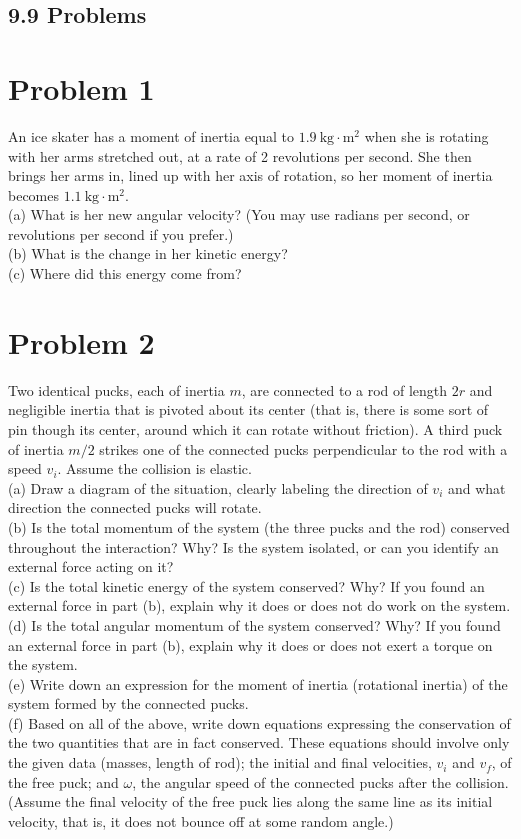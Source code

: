 \documentclass[10pt]{article}
\begin{document}
\subsection*{9.9 Problems}
\section*{Problem 1}
An ice skater has a moment of inertia equal to $1.9 \mathrm{~kg} \cdot \mathrm{m}^{2}$ when she is rotating with her arms stretched out, at a rate of 2 revolutions per second. She then brings her arms in, lined up with her axis of rotation, so her moment of inertia becomes $1.1 \mathrm{~kg} \cdot \mathrm{m}^{2}$.\\
(a) What is her new angular velocity? (You may use radians per second, or revolutions per second if you prefer.)\\
(b) What is the change in her kinetic energy?\\
(c) Where did this energy come from?

\section*{Problem 2}
Two identical pucks, each of inertia $m$, are connected to a rod of length $2 r$ and negligible inertia that is pivoted about its center (that is, there is some sort of pin though its center, around which it can rotate without friction). A third puck of inertia $m / 2$ strikes one of the connected pucks perpendicular to the rod with a speed $v_{i}$. Assume the collision is elastic.\\
(a) Draw a diagram of the situation, clearly labeling the direction of $v_{i}$ and what direction the connected pucks will rotate.\\
(b) Is the total momentum of the system (the three pucks and the rod) conserved throughout the interaction? Why? Is the system isolated, or can you identify an external force acting on it?\\
(c) Is the total kinetic energy of the system conserved? Why? If you found an external force in part (b), explain why it does or does not do work on the system.\\
(d) Is the total angular momentum of the system conserved? Why? If you found an external force in part (b), explain why it does or does not exert a torque on the system.\\
(e) Write down an expression for the moment of inertia (rotational inertia) of the system formed by the connected pucks.\\
(f) Based on all of the above, write down equations expressing the conservation of the two quantities that are in fact conserved. These equations should involve only the given data (masses, length of rod); the initial and final velocities, $v_{i}$ and $v_{f}$, of the free puck; and $\omega$, the angular speed of the connected pucks after the collision. (Assume the final velocity of the free puck lies along the same line as its initial velocity, that is, it does not bounce off at some random angle.)
\end{document}
